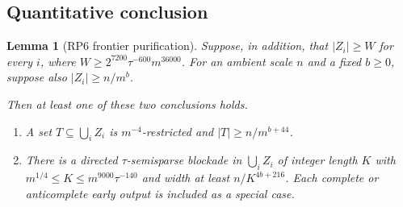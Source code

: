 \documentclass[11pt,a4paper]{article}
\newtheorem{lemma}[theorem]{Lemma}
\theoremstyle{definition}
\theoremstyle{remark}
\numberwithin{equation}{section}
\begin{document}
\subsection{Quantitative conclusion}\label{subsec:rp6-frontier}
\begin{lemma}[RP6 frontier purification]\label{lem:rp6-frontier}
Suppose, in addition, that \(|Z_{i}|\ge\allowbreak W\) for every \(i\), where \(W \ge\allowbreak  2^{7200} \tau^{-600} m^{36000}\). For an ambient scale \(n\) and a fixed \(b\ge\allowbreak 0\), suppose also \(|Z_{i}|\ge\allowbreak n/m^{b}\).

Then at least one of these two conclusions holds.
\begin{enumerate}[label=(\Alph*)]
\item A set \(T\subseteq\bigcup_i Z_{i}\) is \(m^{-4}\)-restricted and \(|T|\ge n/m^{b+44}\).
\item There is a directed \(\tau\)-semisparse blockade in \(\bigcup_i Z_{i}\) of integer length \(K\) with \(m^{1/4} \le K \le m^{9000} \tau^{-140}\) and width at least \(n/K^{4b+216}\). Each complete or anticomplete early output is included as a special case.
\end{enumerate}





\end{lemma}
\end{document}
